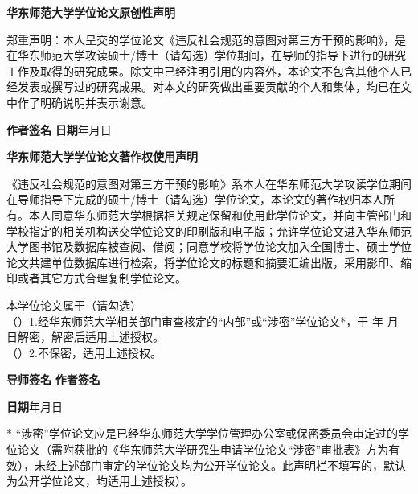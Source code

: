 \thispagestyle{empty}
{\centerline{\Large \bf 华东师范大学学位论文原创性声明}

\vspace{0.5cm}
郑重声明：本人呈交的学位论文《违反社会规范的意图对第三方干预的影响》，是在华东师范大学攻读硕士/博士（请勾选）学位期间，在导师的指导下进行的研究工作及取得的研究成果。除文中已经注明引用的内容外，本论文不包含其他个人已经发表或撰写过的研究成果。对本文的研究做出重要贡献的个人和集体，均已在文中作了明确说明并表示谢意。

\vspace{0.5cm}
{\bf 作者签名} \hfill {\bf 日期}\makebox[1.5cm]{}年\makebox[1cm]{}月\makebox[1cm]{}日

\vfill
\centerline{\Large \bf 华东师范大学学位论文著作权使用声明}

\vspace{0.5cm}
《违反社会规范的意图对第三方干预的影响》系本人在华东师范大学攻读学位期间在导师指导下完成的硕士/博士（请勾选）学位论文，本论文的著作权归本人所有。本人同意华东师范大学根据相关规定保留和使用此学位论文，并向主管部门和学校指定的相关机构送交学位论文的印刷版和电子版；允许学位论文进入华东师范大学图书馆及数据库被查阅、借阅；同意学校将学位论文加入全国博士、硕士学位论文共建单位数据库进行检索，将学位论文的标题和摘要汇编出版，采用影印、缩印或者其它方式合理复制学位论文。

本学位论文属于（请勾选）\\
\indent（\makebox[0.5cm]{}）1.经华东师范大学相关部门审查核定的“内部”或“涉密”学位论文*，于\makebox[0.8cm]{} 年 \makebox[0.5cm]{} 月 \makebox[0.5cm]{} 日解密，解密后适用上述授权。\\
\indent（\makebox[0.5cm]{}）2.不保密，适用上述授权。

\vspace{0.5cm}
{\bf 导师签名} \hfill {\bf 作者签名} \makebox[4cm]{}

\vspace{0.5cm}
\hfill {\bf 日期}\makebox[1.5cm]{}年\makebox[1cm]{}月\makebox[1cm]{}日

\vfill
* “涉密”学位论文应是已经华东师范大学学位管理办公室或保密委员会审定过的学位论文（需附获批的《华东师范大学研究生申请学位论文“涉密”审批表》方为有效），未经上述部门审定的学位论文均为公开学位论文。此声明栏不填写的，默认为公开学位论文，均适用上述授权）。
}

\newpage
